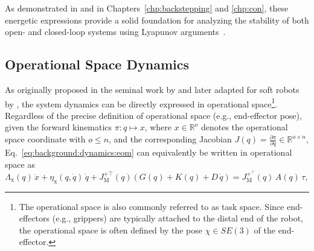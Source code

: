 As demonstrated in \citet{della2020model, della2023model} and in Chapters~\ref{chp:backstepping} and \ref{chp:con}, these energetic expressions provide a solid foundation for analyzing the stability of both open- and closed-loop systems using Lyapunov arguments~\citep{khalil2002nonlinear}.

\subsection{Operational Space Dynamics}\label{sub:background:dynamics:operational_space}
As originally proposed in the seminal work by \citet{khatib1987unified} and later adapted for soft robots by \citet{della2020model}, the system dynamics can be directly expressed in operational space\footnote{The operational space is also commonly referred to as task space. Since end-effectors (e.g., grippers) are typically attached to the distal end of the robot, the operational space is often defined by the pose $\chi \in SE(3)$ of the end-effector.}. Regardless of the precise definition of operational space (e.g., end-effector pose), given the forward kinematics $\pi: q \mapsto x$, where $x \in \mathbb{R}^o$ denotes the operational space coordinate with $o \leq n$, and the corresponding Jacobian $J(q) = \frac{\partial \pi}{\partial q} \in \mathbb{R}^{o \times n}$, Eq.~\ref{eq:background:dynamics:eom} can equivalently be written in operational space as
\begin{equation}\label{eq:background:dynamics:eom_operational_space}
    \Lambda_\mathrm{x}(q) \, \ddot{x} + \eta_\mathrm{x}(q, \dot{q}) \, \dot{q} + J_\mathrm{M}^{+\top}(q) \left ( G(q) + K(q) + D \, \dot{q} \right ) = J_\mathrm{M}^{+^\top}(q) \, A(q) \, \tau,
\end{equation}

